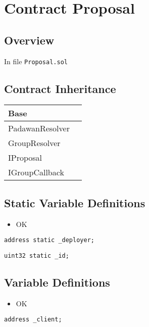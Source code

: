 
\chapter{Contract Proposal}

\minitoc

\section{Overview}


In file {\tt Proposal.sol}

\section{Contract Inheritance}


\noindent\begin{tabular}{|l|p{5cm}|}\hline
Base & \\\hline
PadawanResolver & \\\hline
GroupResolver & \\\hline
IProposal & \\\hline
IGroupCallback & \\\hline
\end{tabular}


\section{Static Variable Definitions}

\begin{itemize}
\item OK
\end{itemize}


\begin{lstlisting}[firstnumber=15]
    address static _deployer;
\end{lstlisting}

\begin{lstlisting}[firstnumber=16]
    uint32 static _id;
\end{lstlisting}

\section{Variable Definitions}


\begin{itemize}
\item OK
\end{itemize}

\begin{lstlisting}[firstnumber=18]
    address _client;
\end{lstlisting}

